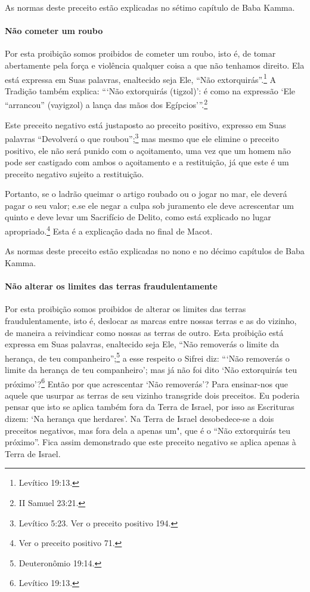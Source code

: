 As normas deste preceito estão explicadas no sétimo capítulo de Baba Kamma.

\paragraph{Não cometer um roubo}

Por esta proibição somos proibidos de cometer um roubo, isto é, de tomar
abertamente pela força e violência qualquer coisa a que não tenhamos
direito. Ela está expressa em Suas palavras, enaltecido seja Ele, ``Não
extorquirás''.\footnote{Levítico 19:13.} A Tradição também explica: ```Não
extorquirás (tigzol)': é como na expressão `Ele ``arrancou'' (vayigzol)
a lança das mãos dos Egípcios'''.\footnote{II Samuel 23:21.}

Este preceito negativo está justaposto ao preceito positivo, expresso
em Suas palavras ``Devolverá o que roubou'';\footnote{Levítico
5:23. Ver o preceito positivo 194.} mas mesmo que ele elimine o preceito
positivo, ele não será punido com o açoitamento, uma vez que um homem
não pode ser castigado com ambos o açoitamento e a restituição, já que este é um preceito negativo sujeito a restituição.

Portanto, se o ladrão queimar o artigo roubado ou o jogar no mar, ele
deverá pagar o seu valor; e.se ele negar a culpa sob juramento ele deve
acrescentar um quinto e deve levar um Sacrifício de Delito, como está
explicado no lugar apropriado.\footnote{Ver o preceito positivo 71.} Esta é a explicação
dada no final de Macot.

As normas deste preceito estão explicadas no nono e no décimo capítulos de Baba Kamma.

\paragraph{Não alterar os limites das terras fraudulentamente}

Por esta proibição somos proibidos de alterar os limites das terras
fraudulentamente, isto é, deslocar as marcas entre nossas terras e as do
vizinho, de maneira a reivindicar como nossas as terras de outro. Esta
proibição está expressa em Suas palavras, enaltecido seja Ele, ``Não
removerás o limite da herança, de teu companheiro'';\footnote{Deuteronômio
19:14.} a esse respeito o Sifrei diz: ```Não removerás o limite da
herança de teu companheiro'; mas já não foi dito `Não extorquirás teu
próximo'?\footnote{Levítico 19:13.} Então por que acrescentar `Não removerás'?
Para ensinar-nos que aquele que usurpar as terras de seu vizinho
transgride dois preceitos. Eu poderia pensar que isto se aplica também
fora da Terra de Israel, por isso as Escrituras dizem: `Na herança que
herdares'. Na Terra de Israel desobedece-se a dois preceitos negativos,
mas fora dela a apenas um", que é o ``Não extorquirás teu próximo''.
Fica assim demonstrado que este preceito negativo se aplica apenas à
Terra de Israel.

